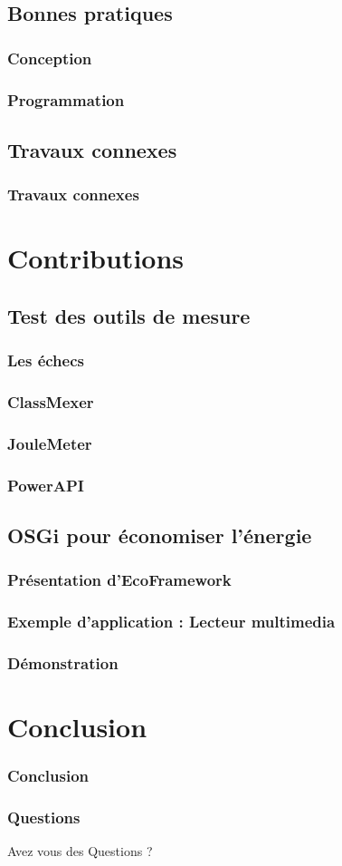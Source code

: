 \documentclass{beamer}
\begin{document}
		\subsection{Bonnes pratiques}
			\begin{frame}
				\frametitle{Conception}
					
			\end{frame}
			\begin{frame}
				\frametitle{Programmation}
					
			\end{frame}
			
		\subsection{Travaux connexes}
			\begin{frame}
				\frametitle{Travaux connexes}
					
			\end{frame}
		
	\section{Contributions}
		\subsection{Test des outils de mesure}
			\begin{frame}
				\frametitle{Les échecs}
				
			\end{frame}
			\begin{frame}
				\frametitle{ClassMexer}
				
			\end{frame}
			\begin{frame}
				\frametitle{JouleMeter}
				
			\end{frame}
			\begin{frame}
				\frametitle{PowerAPI}
				
			\end{frame}
			
		\subsection{OSGi pour économiser l'énergie}
			\begin{frame}
				\frametitle{Présentation d'EcoFramework}
				
			\end{frame}
			\begin{frame}
				\frametitle{Exemple d'application : Lecteur multimedia}
				
			\end{frame}
			\begin{frame}
				\frametitle{Démonstration}
				
			\end{frame}
			
	\section{Conclusion}
		\begin{frame}
			\frametitle{Conclusion}
				
		\end{frame}
		\begin{frame}
			\frametitle{Questions}
				Avez vous des Questions ?
		\end{frame}
\end{document}
